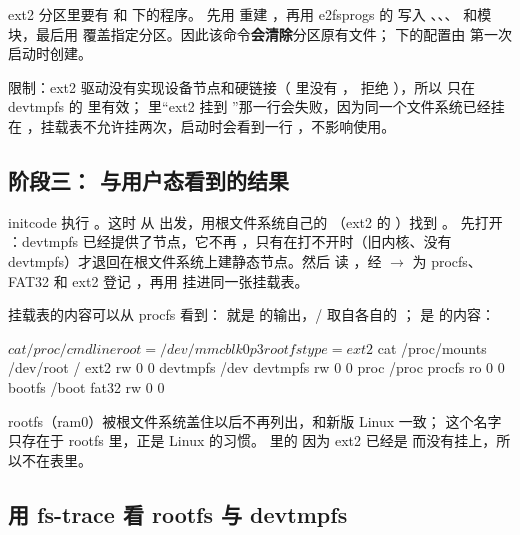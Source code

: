 ext2 分区里要有  和  下的程序。 先用  重建 ，再用 e2fsprogs 的  写入 、、、 和模块，最后用  覆盖指定分区。因此该命令\textbf{会清除}分区原有文件； 下的配置由  第一次启动时创建。

限制：ext2 驱动没有实现设备节点和硬链接（ 里没有 ， 拒绝 ），所以  只在 devtmpfs 的  里有效； 里“ext2 挂到 ”那一行会失败，因为同一个文件系统已经挂在 \code{/}，挂载表不允许挂两次，启动时会看到一行 ，不影响使用。

\subsection{阶段三： 与用户态看到的结果}
\label{sec:ns-stage3}

initcode 执行 。这时  从  出发，用根文件系统自己的 （ext2 的 ）找到 。 先打开 ：devtmpfs 已经提供了节点，它不再 ，只有在打不开时（旧内核、没有 devtmpfs）才退回在根文件系统上建静态节点。然后  读 ，经  $\to$  为 procfs、FAT32 和 ext2 登记 ，再用  挂进同一张挂载表。

挂载表的内容可以从 procfs 看到： 就是  的输出，/ 取自各自的 ； 是  的内容：

\begin{txtcode}
$ cat /proc/cmdline
root=/dev/mmcblk0p3 rootfstype=ext2
$ cat /proc/mounts
/dev/root / ext2 rw 0 0
devtmpfs /dev devtmpfs rw 0 0
proc /proc procfs ro 0 0
bootfs /boot fat32 rw 0 0
\end{txtcode}

rootfs（ram0）被根文件系统盖住以后不再列出，和新版 Linux 一致； 这个名字只存在于 rootfs 里，正是 Linux 的习惯。 里的  因为 ext2 已经是 \code{/} 而没有挂上，所以不在表里。

\subsection{用 fs-trace 看 rootfs 与 devtmpfs}
\label{sec:fs-trace}

